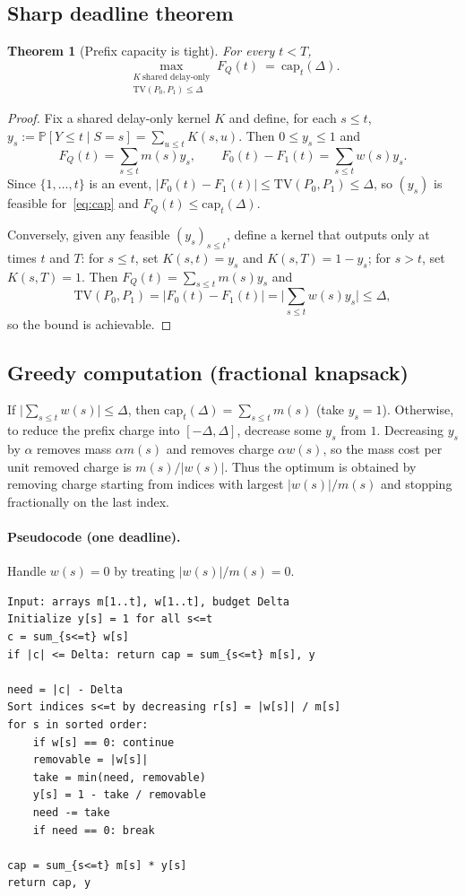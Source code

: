 \documentclass[11pt]{article}
\newtheorem{theorem}{Theorem}[section]
\newcommand{\TV}{\mathrm{TV}}
\newcommand{\Prb}{\mathbb{P}}
\begin{document}
\subsection{Sharp deadline theorem}
\begin{theorem}[Prefix capacity is tight]\label{thm:cap-tight}
For every $t<T$,
\[
\max_{\substack{K\ \text{shared delay-only}\\ \TV(P_0,P_1)\le \Delta}} F_Q(t)\ =\ \mathrm{cap}_t(\Delta).
\]
\end{theorem}

\begin{proof}
Fix a shared delay-only kernel $K$ and define, for each $s\le t$,
$y_s := \Prb[Y\le t\mid S=s]=\sum_{u\le t}K(s,u)$.
Then $0\le y_s\le 1$ and
\[
F_Q(t)=\sum_{s\le t}m(s)y_s,\qquad
F_0(t)-F_1(t)=\sum_{s\le t}w(s)y_s.
\]
Since $\{1,\dots,t\}$ is an event, $|F_0(t)-F_1(t)|\le \TV(P_0,P_1)\le \Delta$, so $(y_s)$ is feasible for~\eqref{eq:cap} and $F_Q(t)\le \mathrm{cap}_t(\Delta)$.

Conversely, given any feasible $(y_s)_{s\le t}$, define a kernel that outputs only at times $t$ and $T$:
for $s\le t$, set $K(s,t)=y_s$ and $K(s,T)=1-y_s$; for $s>t$, set $K(s,T)=1$.
Then $F_Q(t)=\sum_{s\le t}m(s)y_s$ and
\[
\TV(P_0,P_1)=|F_0(t)-F_1(t)|=\big|\sum_{s\le t}w(s)y_s\big|\le \Delta,
\]
so the bound is achievable.
\end{proof}

\subsection{Greedy computation (fractional knapsack)}
If $\big|\sum_{s\le t} w(s)\big|\le \Delta$, then $\mathrm{cap}_t(\Delta)=\sum_{s\le t} m(s)$ (take $y_s=1$).
Otherwise, to reduce the prefix charge into $[-\Delta,\Delta]$, decrease some $y_s$ from $1$.
Decreasing $y_s$ by $\alpha$ removes mass $\alpha m(s)$ and removes charge $\alpha w(s)$, so the mass cost per unit removed charge is $m(s)/|w(s)|$.
Thus the optimum is obtained by removing charge starting from indices with largest $|w(s)|/m(s)$ and stopping fractionally on the last index.

\paragraph{Pseudocode (one deadline).} Handle $w(s)=0$ by treating $|w(s)|/m(s)=0$.
\begin{verbatim}
Input: arrays m[1..t], w[1..t], budget Delta
Initialize y[s] = 1 for all s<=t
c = sum_{s<=t} w[s]
if |c| <= Delta: return cap = sum_{s<=t} m[s], y

need = |c| - Delta
Sort indices s<=t by decreasing r[s] = |w[s]| / m[s]
for s in sorted order:
    if w[s] == 0: continue
    removable = |w[s]|
    take = min(need, removable)
    y[s] = 1 - take / removable
    need -= take
    if need == 0: break

cap = sum_{s<=t} m[s] * y[s]
return cap, y
\end{verbatim}
\end{document}
